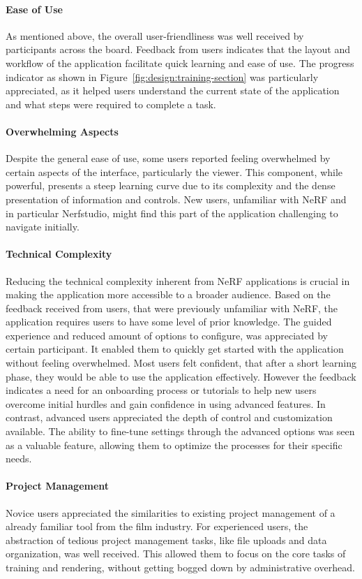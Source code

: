 \paragraph{Ease of Use}
As mentioned above, the overall user-friendliness was well received by participants across the board.
Feedback from users indicates that the layout and workflow of the application facilitate quick learning and ease of use.
The progress indicator as shown in Figure~\ref{fig:design:training-section} was particularly appreciated, as it helped users understand the current state of the application and what steps were required to complete a task.

\paragraph{Overwhelming Aspects}
Despite the general ease of use, some users reported feeling overwhelmed by certain aspects of the interface, particularly the viewer. 
This component, while powerful, presents a steep learning curve due to its complexity and the dense presentation of information and controls. 
New users, unfamiliar with NeRF and in particular Nerfstudio, might find this part of the application challenging to navigate initially.

\paragraph{Technical Complexity}
Reducing the technical complexity inherent from NeRF applications is crucial in making the application more accessible to a broader audience.
Based on the feedback received from users, that were previously unfamiliar with NeRF, the application requires users to have some level of prior knowledge.
The guided experience and reduced amount of options to configure, was appreciated by certain participant.
It enabled them to quickly get started with the application without feeling overwhelmed.
Most users felt confident, that after a short learning phase, they would be able to use the application effectively.
However the feedback indicates a need for an onboarding process or tutorials to help new users overcome initial hurdles and gain confidence in using advanced features.
In contrast, advanced users appreciated the depth of control and customization available.
The ability to fine-tune settings through the advanced options was seen as a valuable feature, allowing them to optimize the processes for their specific needs.

\paragraph{Project Management}
Novice users appreciated the similarities to existing project management of a already familiar tool from the film industry.
For experienced users, the abstraction of tedious project management tasks, like file uploads and data organization, was well received.
This allowed them to focus on the core tasks of training and rendering, without getting bogged down by administrative overhead.

